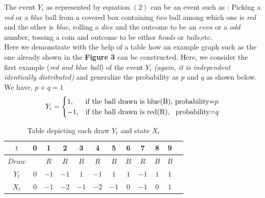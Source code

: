 \documentclass[12pt,a4paper]{article}%
\begin{document}
	\begin{flushleft}
		The event $Y_{i}$ as represented by equation $(2)$ can be an event such as : Picking a \textit{red} or a \textit{blue} ball from a covered box containing \textit{two} ball among which one is \textit{red} and the other is \textit{blue}, rolling a \textit{dice} and the outcome to be an \textit{even} or a \textit{odd} number, tossing a coin and outcome to be either \textit{heads} or \textit{tails},etc.\\
		Here we demonstrate with the help of a table how an example graph such as the one already shown in the \textbf{Figure 3} can be constructed. Here, we consider the first example (\textit{red and blue ball}) of the event $Y_{i}$ \textit{(again, it is independent identically distributed)} and generalize the probability as $p$ and $q$ as shown below. We have, $p+q=1$
		\begin{equation}
				Y_{i}= 
			\begin{cases}
			1,& \text{if the ball drawn is blue(B), probability=}p\\
			-1,& \text{if the ball drawn is red(R), \enspace probability=}q
			\end{cases}
		\end{equation}
		\begin{table}[ht]
			\centering %
			\begin{tabular}{c c c c c c c c c c c c} %
				\hline %
				$t$ & 0 & 1 & 2 & 3 & 4 & 5 & 6 & 7 & 8 & 9 \\ [0.5ex] %
				\hline %
				$Draw$ & & $R$ & $R$ & $B$ & $R$ & $B$ & $B$ & $R$ & $B$ & $B$  \\ %
				$Y_{t}$ & $0$ & $-1$ & $-1$ & $1$ & $-1$ & $1$ & $1$ & $-1$ & $1$ & $1$  \\
				$X_{t}$ & $0$ & $-1$ & $-2$ & $-1$ & $-2$ & $-1$ & $0$ & $-1$ & $0$ & $1$ \\ [1ex] %
				\hline %
			\end{tabular}
			\caption{Table depicting each draw $Y_{t}$ and state $X_{t}$} 
		\end{table}
	\begin{center}
\end{center}
\end{flushleft}
\end{document}
